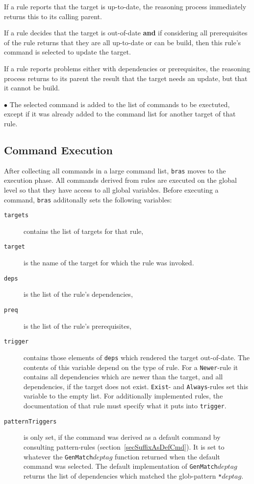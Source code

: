 \documentclass[12pt]{article}
\newcommand{\bras}{\texttt{bras}}
\begin{document}
If a rule reports that the target is up-to-date,
the reasoning process immediately returns this to its calling parent.

If a rule decides that the target is out-of-date \textbf{and} if
considering all prerequisites of the rule returns that they are all
up-to-date or can be build, then this rule's command is selected to
update the target.

If a rule reports problems either with dependencies or
prerequisites, the reasoning process returns to its parent the result
that the target needs an update, but that it cannot be build.

$\bullet$ The selected command is added to the list of commands to be
exectuted, except if it was already added to the command
list for another target of that rule.

\subsection{Command Execution}
\label{secCmdExec}

After collecting all commands in a large command list, \bras{} moves
to the execution phase. All commands derived from rules are executed
on the global level so that they have access to all global
variables. Before executing a command, \bras{} additonally sets the
following variables:

\begin{description}
\item[\texttt{targets}] 
contains the list of targets for that rule,

\item[\texttt{target}] 
is the name of the target for which the rule
was invoked.

\item[\texttt{deps}] 
is the list of the rule's dependencies,

\item[\texttt{preq}] 
is the list of the rule's prerequisites,

\item[\texttt{trigger}]
contains those elements of \texttt{deps} which rendered the target
out-of-date. The contents of this variable depend on the type of
rule. For a \texttt{Newer}-rule it contains all dependencies which are
newer than the target, and all dependencies, if the target does not
exist. \texttt{Exist}- and \texttt{Always}-rules set this variable to
the empty list. For additionally implemented rules, the documentation
of that rule must specify what it puts into \texttt{trigger}.

\item[\texttt{patternTriggers}] is only set, if the command was
derived as a default command by consulting pattern-rules
(section~\ref{secSuffixAsDefCmd}). It is set to whatever the
\texttt{GenMatch$deptag$} function returned when the default command
was selected. The default implementation of \texttt{GenMatch$deptag$}
returns the list of dependencies which matched the glob-pattern
\texttt{*$deptag$}.
\end{description}
\end{document}
